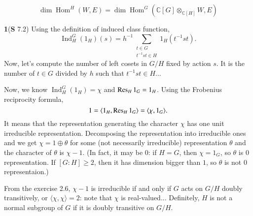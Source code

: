 \documentclass[a4paper, 12pt]{article}
\theoremstyle{Mydefinition}
\theoremstyle{Mytheorem}
\DeclareMathOperator{\Ind}{Ind}
\DeclareMathOperator{\Hom}{Hom}
\begin{document}
\begin{equation}
    \dim\Hom^H(W,E) = \dim\Hom^G(\mathbb{C}[G]\otimes_{\mathbb{C}[H]}W,E)
\end{equation}


\noindent \textbf{1}(\textbf{S} 7.2)
Using the definition of induced class function,
\begin{equation}
    \Ind_H^G(1_H)(s) = h^{-1}\sum_{\substack{t\in G\\ t^{-1}st\in H}}1_H(t^{-1}st).
\end{equation}
Now, let's compute the number of left cosets in $G/H$ fixed by action $s$. It is the number of $t\in G$ divided by $h$ such that $t^{-1}st\in H$...

Now, we know $\Ind_H^G(1_H) = \chi$ and $\Res_H 1_G = 1_H$. Using the Frobenius reciprocity formula,
\begin{equation}
    1 = \langle 1_H, \Res_H 1_G\rangle = \langle \chi, 1_G\rangle.
\end{equation}
It means that the representation generating the character $\chi$ has one unit irreducible representation. Decomposing the representation into irreducible ones and we get $\chi = 1\oplus \theta$ for some (not necessarily irreducible) representation $\theta$ and the character of $\theta$ is $\chi-1$. (In fact, it may be 0: if $H=G$, then $\chi = 1_G$, so $\theta$ is $0$ representation. If $[G:H]\geq 2$, then it has dimension bigger than $1$, so $\theta$ is not $0$ representaion.)

From the exercise 2.6, $\chi-1$ is irreducible if and only if $G$ acts on $G/H$ doubly transitively, or $\langle \chi, \chi\rangle = 2$: note that $\chi$ is real-valued... Definitely, $H$ is not a normal subgroup of $G$ if it is doubly transitive on $G/H$.
\end{document}
